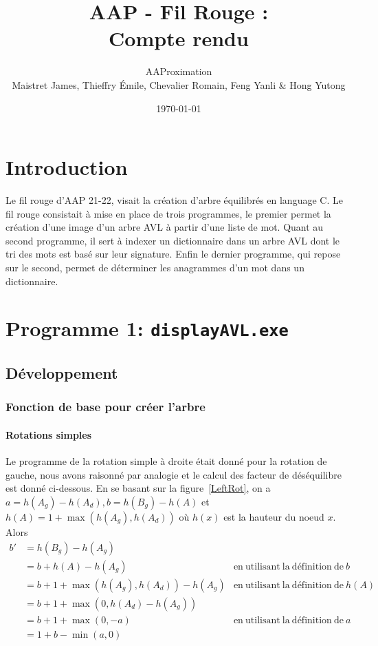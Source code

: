 \documentclass{article} %
\title{AAP - Fil Rouge :\\ Compte rendu}
\author{AAProximation \\ Maistret James, Thieffry \'Emile, Chevalier Romain, Feng Yanli \&  Hong Yutong}
\date{\today}
\begin{document}
\maketitle
\setcounter{secnumdepth}{3}
\setcounter{tocdepth}{3}

\tableofcontents
\listoffigures

\newpage

\section{Introduction}

Le fil rouge d'AAP 21-22, visait la création d'arbre équilibrés en language C. Le fil rouge consistait à mise en place de trois programmes, le premier permet la création d'une image d'un arbre AVL à partir d'une liste de mot. Quant au second programme, il sert à indexer un dictionnaire dans un arbre AVL dont le tri des mots est basé sur leur signature. Enfin le dernier programme, qui repose sur le second, permet de déterminer les anagrammes d'un mot dans un dictionnaire. 

\section{Programme 1: \texttt{displayAVL.exe}}
\label{sec:prog_1}
\subsection{Développement}
\subsubsection{Fonction de base pour créer l'arbre}
\paragraph{Rotations simples} Le programme de la rotation simple à droite était donné pour la rotation de gauche, nous avons raisonné par analogie et le calcul des facteur de déséquilibre est donné ci-dessous. En se basant sur la figure~\ref{LeftRot}, on a \( a = h(A_g) - h(A_d), b = h(B_g) - h(A)\) et \(h(A) = 1 +\max (h(A_g), h(A_d)) \) où \(h(x)\) est la hauteur du noeud \(x\). Alors 
\begin{align*}
b' &= h(B_g)-h(A_g) \\
&= b + h(A) - h(A_g) & \mathrm{en\  utilisant \ la \  définition \  de } \ b  \\
&= b +  1 +\max (h(A_g), h(A_d)) - h(A_g) & \mathrm{en \ utilisant \ la \ définition\ de} \ h(A)  \\
&= b + 1 + \max(0, h(A_d)-h(A_g))\\
&= b + 1 + \max(0, -a) & \mathrm{en\  utilisant \ la \  définition \  de } \ a \\
&= 1+ b -\min(a,0)
\end{align*} %
\end{document}
